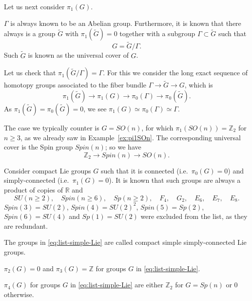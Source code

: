 \documentclass[12pt]{article}
\numberwithin{equation}{section}
\def\bR{\mathbb{R}}
\def\bZ{\mathbb{Z}}
\begin{document}
Let us next consider $\pi_1(G)$. 
\begin{fact}
$\Gamma$ is always known to be an Abelian group.
Furthermore, it is known that there always is a group $\tilde G$ with $\pi_1(\tilde G)=0$
together with a subgroup $\Gamma \subset \tilde G$ such that \begin{equation}
G=\tilde G/\Gamma.
\end{equation}
Such $\tilde G$ is known as the universal cover of $G$.
\end{fact}
Let us check that $\pi_1(\tilde G/\Gamma)=\Gamma$.
For this we consider the long exact sequence of homotopy groups associated to 
the fiber bundle $\Gamma\to \tilde G\to G$, which is \begin{equation}
\pi_1(\tilde G)\to \pi_1(G)\to \pi_0(\Gamma)\to \pi_0(\tilde G).
\end{equation}
As $\pi_1(\tilde G)=\pi_0(\tilde G)=0$, we see $\pi_1(G)\simeq \pi_0(\Gamma)\simeq \Gamma$.

The case we typically counter is $G=SO(n)$, for which $\pi_1(SO(n))=\bZ_2$ for $n\ge 3$, as we already saw in Example~\ref{ex:pi1SOn}.
The corresponding universal cover is the Spin group $Spin(n)$;
so we have \begin{equation}
\bZ_2 \to Spin(n)\to SO(n).
\end{equation}

Consider compact Lie groups $G$ such that 
it is connected (i.e.~$\pi_0(G)=0$)
and simply-connected (i.e.~$\pi_1(G)=0$).
It is known that such groups are always a product of copies of
$\bR$ and \begin{equation}
SU(n\ge 2),\quad
Spin(n\ge 6),\quad
Sp(n\ge 2),\quad
F_4,\quad
G_2,\quad
E_6,\quad
E_7,\quad
E_8.
\label{eq:list-simple-Lie}
\end{equation}
$Spin(3)=SU(2)$, $Spin(4)=SU(2)^2$, $Spin(5)=Sp(2)$, $Spin(6)=SU(4)$
 and $Sp(1)=SU(2)$ 
were excluded from the list, as they are redundant.

The groups in \eqref{eq:list-simple-Lie} are called compact 
simple simply-connected Lie groups.

\begin{fact}
$\pi_2(G)=0$ and $\pi_3(G)=\bZ$ for groups $G$ in \eqref{eq:list-simple-Lie}.
\end{fact}

\begin{fact}
$\pi_4(G)$ for groups $G$ in \eqref{eq:list-simple-Lie} are 
either $\bZ_2$ for $G=Sp(n)$ or $0$ otherwise.
\end{fact}
\end{document}
